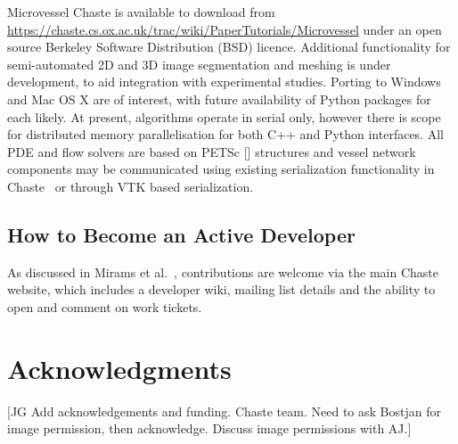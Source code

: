 \documentclass[10pt,letterpaper]{article}
\begin{document}
Microvessel Chaste is available to download from \url{https://chaste.cs.ox.ac.uk/trac/wiki/PaperTutorials/Microvessel} under an open source Berkeley Software Distribution (BSD) licence. Additional functionality for semi-automated 2D and 3D image segmentation and meshing is under development, to aid integration with experimental studies. Porting to Windows and Mac OS X are of interest, with future availability of Python packages for each likely. At present, algorithms operate in serial only, however there is scope for distributed memory parallelisation for both C++ and Python interfaces. All PDE and flow solvers are based on PETSc [] structures and vessel network components may be communicated using existing serialization functionality in Chaste~\cite{Harvey} or through VTK based serialization.

\subsection*{How to Become an Active Developer}

As discussed in Mirams et al.~\cite{Mirams2013}, contributions are welcome via the main Chaste website, which includes a developer wiki, mailing list details and the ability to open and comment on work tickets. 

\section*{Acknowledgments}

[JG Add acknowledgements and funding. Chaste team. Need to ask Bostjan for image permission, then acknowledge. Discuss image permissions with AJ.]

\nolinenumbers
\end{document}
